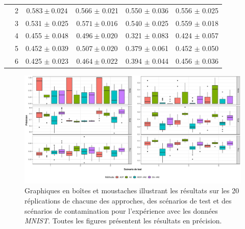 \begin{table}[h]
\begin{tabular}{|c|c|c c c c|}
		& 2 & $0.583 \pm 0.024$ & 0.566 $\pm$ 0.021 & 0.550 $\pm$ 0.036 & 0.556 $\pm$ 0.025  \\
		& 3 & 0.531 $\pm$ 0.025 & $\mathbf{0.571 \pm 0.016}$ & 0.540 $\pm$ 0.025 & 0.559 $\pm$ 0.018  \\
		& 4 & 0.455 $\pm$ 0.048 & $\mathbf{0.496 \pm 0.020}$ & 0.321 $\pm$ 0.083 & 0.424 $\pm$ 0.057  \\			
		& 5 & 0.452 $\pm$ 0.039 & $\mathbf{0.507 \pm 0.020}$ & 0.379 $\pm$ 0.061 & 0.452 $\pm$ 0.050  \\
		& 6 & 0.425 $\pm$ 0.023 & $0.464 \pm 0.022$ & 0.394 $\pm$ 0.044 & 0.456 $\pm$ 0.036  \\
		\midrule
	\end{tabular} 
	\label{tab:precision_mnist}
\end{table}

\begin{figure}[H]
	\centering
	\includegraphics[width=\linewidth]{images/images_boxplots/precision_mnist.pdf}
	\caption[Graphiques en boîtes et moustaches illustrant les résultats de précision pour les données \textit{MNIST}.]{Graphiques en boîtes et moustaches illustrant les résultats sur les 20 réplications de chacune des approches, des scénarios de test et des scénarios de contamination pour l'expérience avec les données \textit{MNIST}. Toutes les figures présentent les résultats en précision.}
	\label{fig:precision_mnist}
\end{figure}

